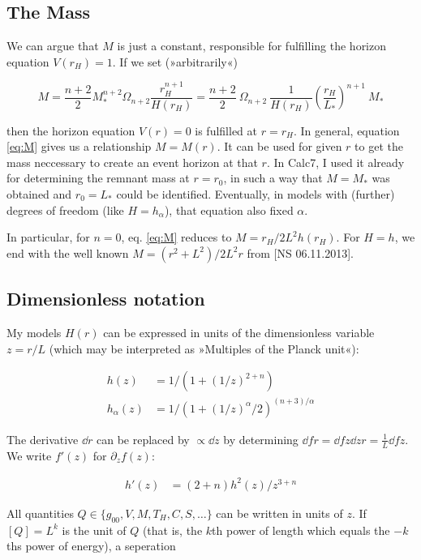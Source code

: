 \documentclass[10pt,a4paper, fleqn]{article}
\begin{document}
\subsection{The Mass}
We can argue that $M$ is just a constant, responsible for fulfilling the horizon equation $V(r_H)=1$. If we set (»arbitrarily«)

\begin{equation}
M = \frac{n+2}{2} M_*^{n+2} \Omega_{n+2} \frac{r_H^{n+1}}{H(r_H)} 
= \frac{n+2}{2} ~\Omega_{n+2}~ \frac{1}{H(r_H)} \left( \frac{r_H}{L_*} \right)^{n+1} ~M_*
 \label{eq:M}
\end{equation}

then the horizon equation $V(r)=0$ is fulfilled at $r=r_H$. In general, equation \ref{eq:M} gives us a relationship $M=M(r)$. It can be used for given $r$ to get the mass neccessary to create an event horizon at that $r$. In Calc7, I used it already for determining the remnant mass at $r=r_0$, in such a way that $M = M_*$ was obtained and $r_0 = L_*$ could be identified. Eventually, in models with (further) degrees of freedom (like $H=h_\alpha$), that equation also fixed $\alpha$.

In particular, for $n=0$, eq. \ref{eq:M} reduces to $M = r_H / 2 L^2 h(r_H)$. For $H = h$, we end with the well known $M= (r^2 + L^2) / 2L^2 r$ from [NS 06.11.2013].

\subsection{Dimensionless notation}
My models $H(r)$ can be expressed in units of the dimensionless variable $z=r/L$ (which may be interpreted as »Multiples of the Planck unit«):

\begin{align}
h(z) &= 1/(1 + (1/z)^{2+n}) \\
h_\alpha(z) &= 1/(1+ (1/z)^\alpha / 2)^{(n+3)/\alpha}
\end{align}

The derivative $\dd{}{r}$  can be replaced by $\propto \dd{}{z}$ by determining $\dd{f}{r}=\dd{f}{z}\dd{z}{r}=\frac 1L\dd{f}{z}$. We write $f'(z)$ for $\partial_z f(z)$:

\begin{align}
h'(z) &= (2+n) h^2(z) / z^{3+n}
\end{align}

All quantities $Q \in \{g_{00}, V, M, T_H, C, S, \dots \}$ can be written in units of $z$. If $[Q] = L^k$ is the unit of $Q$ (that is, the $k$th power of length which equals the $-k$ths power of energy), a seperation
\end{document}
